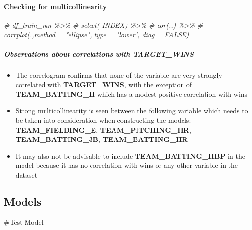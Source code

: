 \documentclass[
]{article}
\newenvironment{Shaded}{\begin{snugshade}}{\end{snugshade}}
\newcommand{\CommentTok}[1]{\textcolor[rgb]{0.56,0.35,0.01}{\textit{#1}}}
\providecommand{\tightlist}{%
  \setlength{\itemsep}{0pt}\setlength{\parskip}{0pt}}
\begin{document}
\hypertarget{checking-for-multicollinearity}{%
\paragraph{Checking for
multicollinearity}\label{checking-for-multicollinearity}}

\begin{Shaded}
\begin{Highlighting}[]
\CommentTok{\# df\_train\_mn \%\textgreater{}\% }
\CommentTok{\#  select({-}INDEX) \%\textgreater{}\% }
\CommentTok{\#   cor(.,) \%\textgreater{}\% }
\CommentTok{\#   corrplot(.,method = "ellipse", type = "lower", diag = FALSE)}
\end{Highlighting}
\end{Shaded}

\hypertarget{observations-about-correlations-with-target_wins}{%
\subparagraph{Observations about correlations with
TARGET\_WINS}\label{observations-about-correlations-with-target_wins}}

\begin{itemize}
\tightlist
\item
  The correlogram confirms that none of the variable are very strongly
  correlated with \textbf{TARGET\_WINS}, with the exception of
  \textbf{TEAM\_BATTING\_H} which has a modest positive correlation with
  wins
\item
  Strong multicollinearity is seen between the following variable which
  needs to be taken into consideration when constructing the models:
  \textbf{TEAM\_FIELDING\_E}, \textbf{TEAM\_PITCHING\_HR},
  \textbf{TEAM\_BATTING\_3B}, \textbf{TEAM\_BATTING\_HR}
\item
  It may also not be advisable to include \textbf{TEAM\_BATTING\_HBP} in
  the model because it has no correlation with wins or any other
  variable in the dataset
\end{itemize}

\hypertarget{models}{%
\subsection{\texorpdfstring{\textbf{Models}}{Models}}\label{models}}

\#Test Model
\end{document}
